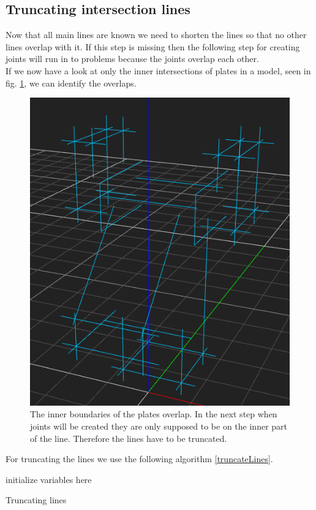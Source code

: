 \documentclass[../ClassicThesis.tex]{subfiles}
\begin{document}
\subsection{Truncating intersection lines}
Now that all main lines are known we need to shorten the lines so that no other lines overlap with it. If this step is missing then the following step for creating joints will run in to problems because the joints overlap each other.\\
If we now have a look at only the inner intersections of plates in a model, seen in fig. \ref{fig:innerBoundaries}, we can identify the overlaps.
\begin{figure}[!ht]
\centering
\includegraphics[width=.5\columnwidth]{Images/HeadInnerBoundaries.png}
\caption{The inner boundaries of the plates overlap. In the next step when joints will be created they are only supposed to be on the inner part of the line. Therefore the lines have to be truncated.}
\label{fig:innerBoundaries}
\end{figure}
For truncating the lines we use the following algorithm \ref{truncateLines}.
\\
\begin{algorithm}[H]
	\DontPrintSemicolon
	initialize variables here\;
  	\caption{Truncating lines}
  	\label{truncateLines}
\end{algorithm}
\end{document}
